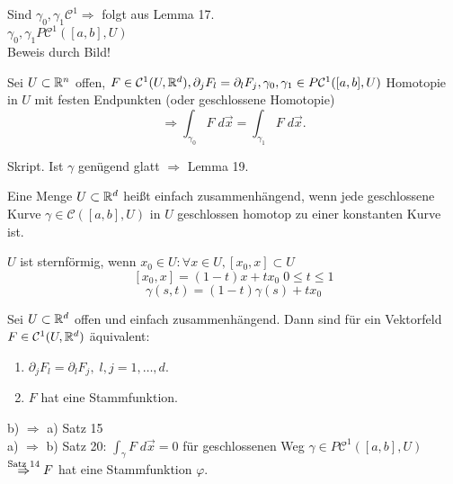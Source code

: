 \documentclass[../ana2.tex]{subfiles}
\begin{document}
\begin{bew}
    Sind \(\gamma_0, \gamma_1 \mathcal{C}^1 \Rightarrow\) folgt aus Lemma 17.\\
    \(\gamma_0,\gamma_1 P \mathcal{C}^1([a,b], U)\)\\    
    Beweis durch Bild!
\end{bew}
\begin{satz}[Homotopieinvarianz]
    Sei \( U \subset \mathbb{R}^n \) offen, \( F \in \mathcal{C}^1(U, \mathbb{R}^d), 
    \partial_j F_l = \partial_l F_j, \gamma_0, \gamma_1 \in P\mathcal{C}^1([a,b], U) \)
    Homotopie in \( U \) mit festen Endpunkten (oder geschlossene Homotopie)
    \[ \Rightarrow \int_{\gamma_0} F \; d\vec{x} = \int_{\gamma_1} F \; d\vec{x}. \]
\end{satz}
\begin{bew}
    Skript. Ist \( \gamma \) genügend glatt \( \Rightarrow \) Lemma 19.
\end{bew}
\begin{defi}
    Eine Menge \(U \subset \mathbb{R}^d\) heißt einfach zusammenhängend, wenn jede
    geschlossene Kurve \(\gamma \in \mathcal{C}([a,b], U)\) in \(U\)
    geschlossen homotop zu einer konstanten Kurve ist.
\end{defi}
\begin{bsp}
    \(U\) ist sternförmig, wenn 
    \( x_0 \in U: \forall x \in U, [x_0, x] \subset U \)
    \[ [x_0, x] = (1-t) x + tx_0 \; 0 \leq t \leq 1 \]
    \[ \gamma(s,t) = (1-t) \gamma(s) + t x_0 \]
\end{bsp}
\begin{satz}
    Sei \( U \subset \mathbb{R}^d \) offen und einfach zusammenhängend. Dann sind für ein Vektorfeld 
    \( F \in \mathcal{C}^1(U, \mathbb{R}^d) \) äquivalent:
    \begin{enumerate}
        \item \( \partial_j F_l = \partial_l F_j,\; l,j = 1,\ldots, d \).
        \item \( F \) hat eine Stammfunktion.
    \end{enumerate}
\end{satz}
\begin{bew}
    b) \(\Rightarrow\) a) Satz 15\\
    a) \(\Rightarrow\) b) Satz 20: \( \int_\gamma F \; d \vec{x} = 0 \) 
    für geschlossenen Weg \( \gamma \in P \mathcal{C}^1([a,b], U) \)\\
    \( \overset{\text{Satz 14}}{\Rightarrow} F \) hat eine Stammfunktion \( \varphi \).
\end{bew}
\end{document}
